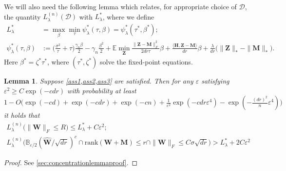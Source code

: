 \documentclass[10pt]{article}
\newcommand{\eps}{\ensuremath{\varepsilon}}
\newcommand{\s}{^*}
\renewcommand{\hat}{\widehat}
\newtheorem{lemma}{Lemma}
\theoremstyle{definition}
\begin{document}
We will also need the following lemma which relates, for appropriate choice of $\mathcal{D}$, the quantity $L^{(n)}_{\lambda}(\mathcal{D})$ with $L_{\lambda}^{*}$, where we define
\begin{align}
    L_{\lambda}^{*} &= \max_{\beta} \min_{\tau} \psi_{\lambda}^{*}(\tau,\beta) = \psi_{\lambda}^{*}(\tau\s,\beta\s); \\
    \psi^{*}_{\lambda}(\tau,\beta) &:= \bigg( \frac{\sigma^2}{\tau} + \tau \bigg) \frac{\gamma_n \beta}{2} - \gamma_n \frac{\beta^2}{2} + \mathbb{E} \min_{\bm{Z}} \frac{\|\bm{Z} - \bm{M} \|_F^2}{2dr \tau} \beta + \frac{\langle \bm{H}, \bm{Z} - \bm{M} \rangle}{dr} \beta + \frac{\lambda}{dr} \big( \| \bm{Z}\|_* - \|\bm{M} \|_* \big). \label{psistardef}
\end{align}
Here  $\beta\s = \zeta\s \tau\s$, where $(\tau\s,\zeta\s)$ solve the fixed-point equations. 
\begin{lemma} \label{lem:concentrationlemma} Suppose \cref{ass1,ass2,ass3} are satisfied.  Then for any $\eps$ satisfying $\eps^2 \geq C \exp( - c dr)$  with probability at least
$1 - O\bigg( \exp( - c d) +  \exp( - c dr) + \exp( - c n) + \frac{1}{\eps^2} \exp(-c dr \eps^4 ) - \exp( - \frac{(dr)^2}{n} \eps^4) \bigg)$ it holds that
    \begin{align}
        L_{\lambda}^{(n)}\bigg( \| \bm{W} \|_F \leq R \bigg) \leq L_{\lambda}\s + C \eps^2 ;  \label{eq:thinktoprove1} \\
        L_{\lambda}^{(n)}\big( \mathbb{B}_{\eps/2}(\bm{\hat W}/\sqrt{dr})^c \cap \mathrm{rank}(\bm{W} + \bm{M}) \leq r \cap \|\bm{W}\|_F \leq C \sigma \sqrt{dr} \bigg) > L_{\lambda}\s + 2 C \eps^2 \label{eq:thingtoprove}
    \end{align}
\end{lemma}

\begin{proof}
    See \cref{sec:concentrationlemmaproof}.
\end{proof}
\end{document}
